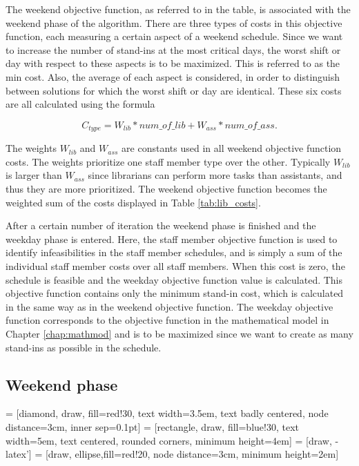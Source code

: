 The weekend objective function, as referred to in the table, is associated with the weekend phase of the algorithm. There are three types of costs in this objective function, each measuring a certain aspect of a weekend schedule. Since we want to increase the number of stand-ins at the most critical days, the worst shift or day with respect to these aspects is to be maximized. This is referred to as the min cost. Also, the average of each aspect is considered, in order to distinguish between solutions for which the worst shift or day are identical. These six costs are all calculated using the formula

\begin{equation}
\label{eq:wend_cost_calc}
C_{type} = W_{lib}*num\_of\_lib + W_{ass}*num\_of\_ass.
\end{equation}

The weights $W_{lib}$ and $W_{ass}$ are constants used in all weekend objective function costs. The weights prioritize one staff member type over the other. Typically $W_{lib}$ is larger than $W_{ass}$ since librarians can perform more tasks than assistants, and thus they are more prioritized. The weekend objective function becomes the weighted sum of the costs displayed in Table \ref{tab:lib_costs}. 

After a certain number of iteration the weekend phase is finished and the weekday phase is entered. Here, the staff member objective function is used to identify infeasibilities in the staff member schedules, and is simply a sum of the individual staff member costs over all staff members. When this cost is zero, the schedule is feasible and the weekday objective function value is calculated. This objective function contains only the minimum stand-in cost, which is calculated in the same way as in the weekend objective function. The weekday objective function corresponds to the objective function in the mathematical model in Chapter \ref{chap:mathmod} and is to be maximized since we want to create as many stand-ins as possible in the schedule.

\subsection{Weekend phase}

 = [diamond, draw, fill=red!30,
    text width=3.5em, text badly centered, node distance=3cm, inner sep=0.1pt]
 = [rectangle, draw, fill=blue!30,
    text width=5em, text centered, rounded corners, minimum height=4em]
 = [draw, -latex']
 = [draw, ellipse,fill=red!20, node distance=3cm,
    minimum height=2em]

